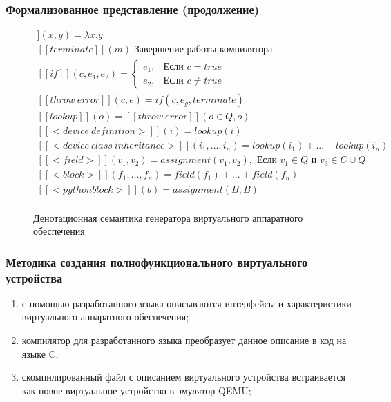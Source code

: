 \begin{frame}%
    \frametitle{Формализованное представление (продолжение)}
    \begin{figure}[!htbp]
        \begin{adjustbox}{max totalsize={\textwidth}{\textheight}}
        \begin{minipage}{\linewidth}
                \centering
                \begingroup
                \begin{gather*}
                    [[assignment]](x,y) = \lambda x.y \\
                    [[terminate]](m) \text{ Завершение работы компилятора} \\
                    [[if]](c,e_1,e_2) =
                    \begin{cases}
                        e_1, & \text{Если } c = true \\
                        e_2, & \text{Если } c \not= true
                    \end{cases} \\
                    [[throw\ error]](c, e) = if(c, e_g, terminate) \\
                    [[lookup]](o) = [[throw\ error]](o \in Q, o) \\
                    [[<device\ definition>]](i) = lookup(i) \\
                    [[<device\ class\ inheritance>]](i_1,...,i_n) = lookup(i_1) + ... + lookup(i_n) \\
                    [[<field>]](v_1, v_2) = assignment(v_1, v_2), \text{ Если } v_1 \in Q \text{ и } v_3 \in C \cup Q \\
                    [[<block>]](f_1,...,f_n) = field(f_1) + ... + field(f_n) \\
                    [[<python block>]](b) = assignment(B,B)\\
                \end{gather*}
                \endgroup
            \end{minipage}
        \end{adjustbox}
        \caption{Денотационная семантика генератора виртуального аппаратного обеспечения}\label{fig:denotational-semantics}
    \end{figure}
\end{frame}%


\begin{frame}%
    \frametitle{Методика создания полнофункционального виртуального устройства}
    \begin{enumerate}
        \item с помощью разработанного языка описываются интерфейсы и характеристики виртуального аппаратного обеспечения;
        \item компилятор для разработанного языка преобразует данное описание в код на языке C;
        \item скомпилированный файл с описанием виртуального устройства встраивается как новое виртуальное
            устройство в эмулятор QEMU;
    \end{enumerate}
\end{frame}


